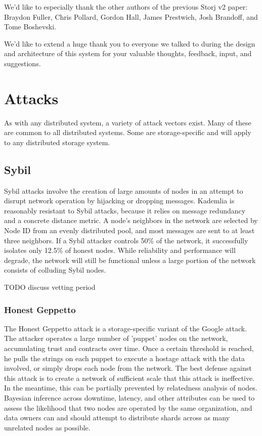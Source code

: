 \documentclass[11pt,fleqn,openany]{book}
\newcommand{\todo}[1]{{\color{red} TODO #1 }}
\begin{document}
We'd like to especially thank the other authors of the previous Storj v2 paper:
Braydon Fuller,
Chris Pollard,
Gordon Hall,
James Prestwich,
Josh Brandoff,
and Tome Boshevski.

We'd like to extend a huge thank you to everyone we talked to during the
design and architecture of this system for your valuable thoughts, feedback,
input, and suggestions.

\newpage \appendix

\chapter{Attacks}

As with any distributed system, a variety of attack vectors exist. Many of these
are common to all distributed systems. Some are storage-specific and will apply
to any distributed storage system.

\section{Sybil}

Sybil attacks involve the creation of large amounts of nodes in an attempt to
disrupt network operation by hijacking or dropping messages. Kademlia
is reasonably
resistant to Sybil attacks, because
it relies on message redundancy and a concrete distance metric.
A node's neighbors in the network are selected by
Node ID from an evenly distributed pool, and most messages are sent to at least
three neighbors. If a Sybil attacker controls 50\% of the network, it
successfully isolates only 12.5\% of honest nodes. While reliability and
performance will degrade, the network will still be functional unless a large
portion of the network consists of colluding Sybil nodes.

\todo{discuss vetting period}

\subsection{Honest Geppetto}

The Honest Geppetto attack is a storage-specific variant of the Google attack.
The attacker operates a large number of 'puppet' nodes on the network,
accumulating trust and contracts over time. Once a certain threshold is reached,
he pulls the strings on each puppet to execute a hostage attack with the data
involved, or simply drops each node from the network. The best defense
against this attack is to create a network of sufficient scale that this attack
is ineffective. In the meantime, this can be partially prevented by relatedness
analysis of nodes. Bayesian inference across downtime, latency, and other
attributes can be used to assess the likelihood that two nodes are operated by
the same organization, and data owners can and should attempt to distribute
shards across as many unrelated nodes as possible.
\end{document}
